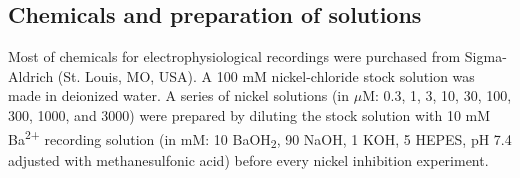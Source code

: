 \subsection*{Chemicals and preparation of solutions}

Most of chemicals for electrophysiological recordings were purchased from Sigma-Aldrich (St. Louis, MO, USA).
A 100 mM nickel-chloride stock solution was made in deionized water.
A series of nickel solutions (in $\mu$M: 0.3, 1, 3, 10, 30, 100, 300, 1000, and 3000) were prepared by diluting the stock solution with 10 mM Ba\textsuperscript{2+} recording solution (in mM: 10 BaOH\textsubscript{2}, 90 NaOH, 1 KOH, 5 HEPES, pH 7.4 adjusted with methanesulfonic acid) before every nickel inhibition experiment. 

    
  